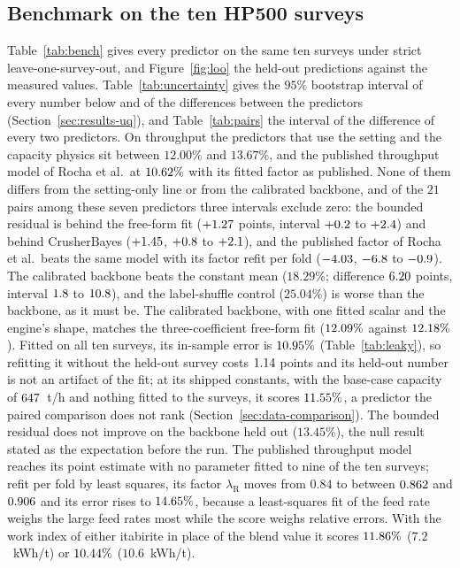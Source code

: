 \subsection{Benchmark on the ten HP500 surveys}\label{sec:results-bench}

Table~\ref{tab:bench} gives every predictor on the same ten surveys under strict leave-one-survey-out, and Figure~\ref{fig:loo} the held-out
predictions against the measured values. Table~\ref{tab:uncertainty} gives the $95\%$ bootstrap interval of every number below and of the differences between the predictors
(Section~\ref{sec:results-uq}), and Table~\ref{tab:pairs} the interval of the difference of every two predictors. On throughput the
predictors that use the setting and the capacity physics sit between $12.00\%$ and $13.67\%$, and the published throughput model of Rocha
et al.\ at $10.62\%$ with its fitted factor as published. None of them differs from the setting-only line or from the calibrated backbone,
and of the $21$ pairs among these seven predictors three intervals exclude zero: the bounded residual is behind the free-form fit
($+1.27$ points, interval $+0.2$ to $+2.4$) and behind CrusherBayes ($+1.45$, $+0.8$ to
$+2.1$), and the published factor of Rocha et al.\ beats the same model
with its factor refit per fold ($-4.03$, $-6.8$ to $-0.9$). The calibrated backbone beats the constant mean ($18.29\%$; difference $6.20$ points, interval $1.8$ to
$10.8$), and the label-shuffle control ($25.04\%$) is worse than the backbone, as it must be. The calibrated backbone, with one fitted
scalar and the engine's shape, matches the three-coefficient free-form fit ($12.09\%$ against $12.18\%$). Fitted on all ten surveys, its
in-sample error is $10.95\%$ (Table~\ref{tab:leaky}), so refitting it without the held-out survey costs $1.14$ points and its
held-out number is not an artifact of the fit; at its shipped constants, with the base-case capacity of $647$~t/h and nothing fitted
to the surveys, it scores $11.55\%$, a predictor the paired comparison does not rank (Section~\ref{sec:data-comparison}). The bounded residual does not improve on the backbone held out ($13.45\%$), the null
result stated as the expectation before the run. The published throughput model reaches its point estimate with no parameter fitted to nine of
the ten surveys; refit per fold by least squares, its factor $\lambda_{\mathrm R}$ moves from $0.84$ to between $0.862$ and $0.906$ and its
error rises to $14.65\%$, because a least-squares fit of the feed rate weighs the large feed rates most while the score weighs relative
errors. With the work index of either itabirite in place of the blend value it scores $11.86\%$ ($7.2$~kWh/t) or $10.44\%$
($10.6$~kWh/t).


